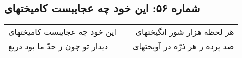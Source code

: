 \begin{center}
\section*{شماره ۵۶: این خود چه عجایبست کامیختهای}
\label{sec:056}
\begin{longtable}{l p{0.5cm} r}
این خود چه عجایبست کامیختهای
&&
هر لحظه هزار شور انگیختهای
\\
دیدار تو چون ز حدّ ما بود دریغ
&&
صد پرده ز هر ذرّه در آویختهای
\\
\end{longtable}
\end{center}
